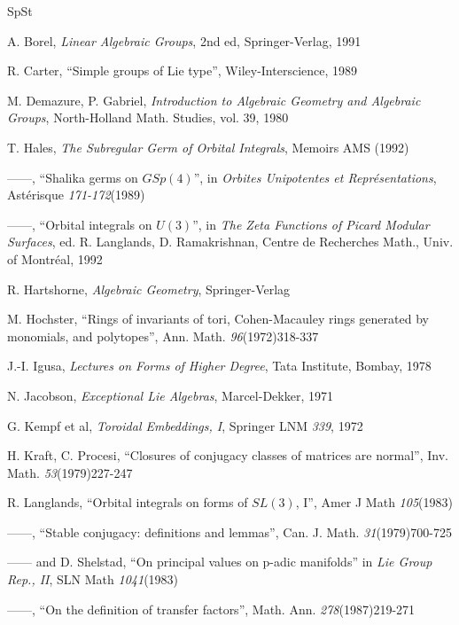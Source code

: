 \documentclass[12pt,letterpaper]{amsart}
\begin{document}
\begin{thebibliography}{SpSt}

 A. Borel, \textit{Linear Algebraic Groups}, 2nd ed,
Springer-Verlag, 1991

 R. Carter, ``Simple groups of Lie type'',
Wiley-Interscience, 1989

 M. Demazure, P. Gabriel, \textit{Introduction
to Algebraic Geometry and Algebraic Groups},
North-Holland Math. Studies, vol. 39, 1980

 T. Hales, \textit{The Subregular Germ of Orbital Integrals},
Memoirs AMS (1992)

 ------, ``Shalika germs on $GSp(4)$'', in
\textit{Orbites Unipotentes et Repr\'esentations}, Ast\'erisque
\textit{171-172}(1989)

 ------, ``Orbital integrals on $U(3)$'', in
\textit{The Zeta Functions of Picard Modular Surfaces},
ed. R. Langlands, D. Ramakrishnan, Centre de Recherches
Math., Univ. of Montr\'eal, 1992

 R. Hartshorne, \textit{Algebraic Geometry},
Springer-Verlag

 M. Hochster, ``Rings of invariants of
tori, Cohen-Macauley rings generated by monomials, and polytopes'',
Ann. Math. \textit{96}(1972)318-337

 J.-I. Igusa, \textit{Lectures on Forms of Higher Degree},
Tata Institute, Bombay, 1978

 N. Jacobson, \textit{Exceptional Lie Algebras},
Marcel-Dekker, 1971

 G. Kempf et al, \textit{Toroidal Embeddings, I},
Springer LNM \textit{339}, 1972

 H. Kraft, C. Procesi, ``Closures of conjugacy
classes of matrices are normal'', Inv. Math.
\textit{53}(1979)227-247

 R. Langlands, ``Orbital integrals on forms of
$SL(3)$, I'', Amer J Math \textit{105}(1983)

 ------, ``Stable conjugacy: definitions and lemmas'',
Can. J. Math. \textit{31}(1979)700-725

 ------ and D. Shelstad, ``On principal values on
p-adic manifolds'' in \textit{Lie Group Rep., II},
SLN Math \textit{1041}(1983)

 ------, ``On the definition of transfer factors'',
Math. Ann. \textit{278}(1987)219-271


\end{thebibliography}
\end{document}
